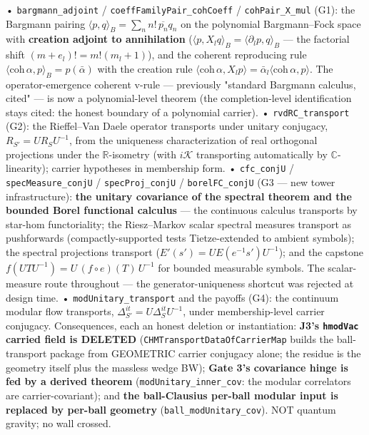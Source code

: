 \documentclass[11pt,a4paper]{article}
\begin{document}
  • \texttt{bargmann\_adjoint} / \texttt{coeffFamilyPair\_cohCoeff} / \texttt{cohPair\_X\_mul} (G1): the Bargmann pairing $\langle p,q\rangle_B=\sum_n n!\,\overline{p_n}q_n$ on the polynomial Bargmann--Fock space with \textbf{creation adjoint to annihilation} ($\langle p, X_l q\rangle_B = \langle \partial_l p, q\rangle_B$ — the factorial shift $(m{+}e_l)! = m!(m_l{+}1)$), and the coherent reproducing rule $\langle \mathrm{coh}\,\alpha, p\rangle_B = p(\bar\alpha)$ with the creation rule $\langle\mathrm{coh}\,\alpha, X_l p\rangle = \bar\alpha_l\langle\mathrm{coh}\,\alpha,p\rangle$. The operator-emergence coherent v-rule — previously "standard Bargmann calculus, cited" — is now a polynomial-level theorem (the completion-level identification stays cited: the honest boundary of a polynomial carrier).
  • \texttt{rvdRC\_transport} (G2): the Rieffel--Van Daele operator transports under unitary conjugacy, $R_{S'} = U R_S U^{-1}$, from the uniqueness characterization of real orthogonal projections under the $\mathbb{R}$-isometry (with $i\mathcal{K}$ transporting automatically by $\mathbb{C}$-linearity); carrier hypotheses in membership form.
  • \texttt{cfc\_conjU} / \texttt{specMeasure\_conjU} / \texttt{specProj\_conjU} / \texttt{borelFC\_conjU} (G3 — new tower infrastructure): \textbf{the unitary covariance of the spectral theorem and the bounded Borel functional calculus} — the continuous calculus transports by star-hom functoriality; the Riesz--Markov scalar spectral measures transport as pushforwards (compactly-supported tests Tietze-extended to ambient symbols); the spectral projections transport ($E'(s') = U E(e^{-1}s')U^{-1}$); and the capstone $f(UTU^{-1}) = U\,(f\circ e)(T)\,U^{-1}$ for bounded measurable symbols. The scalar-measure route throughout — the generator-uniqueness shortcut was rejected at design time.
  • \texttt{modUnitary\_transport} and the payoffs (G4): the continuum modular flow transports, $\Delta^{it}_{S'} = U \Delta^{it}_S U^{-1}$, under membership-level carrier conjugacy. Consequences, each an honest deletion or instantiation: \textbf{J3's \texttt{hmodVac} carried field is DELETED} (\texttt{CHMTransportDataOfCarrierMap} builds the ball-transport package from GEOMETRIC carrier conjugacy alone; the residue is the geometry itself plus the massless wedge BW); \textbf{Gate 3's covariance hinge is fed by a derived theorem} (\texttt{modUnitary\_inner\_cov}: the modular correlators are carrier-covariant); and \textbf{the ball-Clausius per-ball modular input is replaced by per-ball geometry} (\texttt{ball\_modUnitary\_cov}). NOT quantum gravity; no wall crossed.
\end{document}
